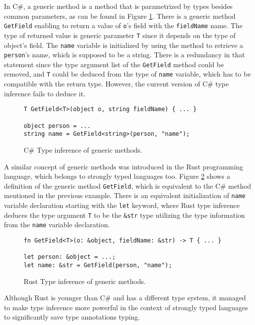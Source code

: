 In C\#, a generic method is a method that is parametrized by types besides common parameters, as can be found in Figure \ref{img03:csharp_gen_meth}.
There is a generic method \texttt{GetField} enabling to return a value of \texttt{o}'s field with the \texttt{fieldName} name.
The type of returned value is generic parameter \texttt{T} since it depends on the type of object's field.
The \texttt{name} variable is initialized by using the method to retrieve a \texttt{person}'s name, which is supposed to be a string.
There is a redundancy in that statement since the type argument list of the \texttt{GetField} method could be removed, and \texttt{T} could be deduced from the type of \texttt{name} variable, which has to be compatible with the return type.
However, the current version of C\# type inference fails to deduce it.
\begin{figure}
\begin{lstlisting}[style=csharp]
T GetField<T>(object o, string fieldName) { ... }

object person = ...
string name = GetField<string>(person, "name");
\end{lstlisting}
\caption{C\# Type inference of generic methods.}
\label{img03:csharp_gen_meth}
\end{figure}
\par
A similar concept of generic methods was introduced in the Rust \cite{online:rust} programming language, which belongs to strongly typed languages too.
Figure \ref{img04:rust_gen_meth} shows a definition of the generic method \texttt{GetField}, which is equivalent to the C\# method mentioned in the previous example.
There is an equivalent initialization of \texttt{name} variable declaration starting with the \texttt{let} keyword, where Rust type inference deduces the type argument \texttt{T} to be the \texttt{\&str} type utilizing the type information from the \texttt{name} variable declaration.
\begin{figure}[h]
\begin{lstlisting}[style=csharp]
fn GetField<T>(o: &object, fieldName: &str) -> T { ... }

let person: &object = ...;
let name: &str = GetField(person, "name");
\end{lstlisting}
\caption{Rust Type inference of generic methods.}
\label{img04:rust_gen_meth}
\end{figure}
\par
Although Rust is younger than C\# and has a different type system, it managed to make type inference more powerful in the context of strongly typed languages to significantly save type annotations typing.
